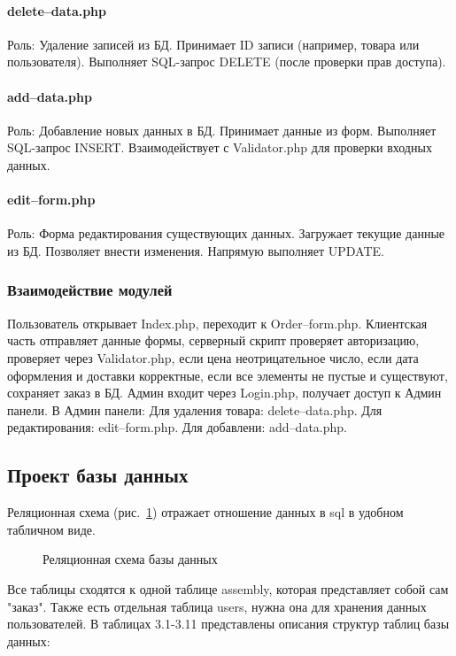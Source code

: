 \paragraph{delete--data.php}
Роль: Удаление записей из БД.
Принимает ID записи (например, товара или пользователя).
Выполняет SQL-запрос DELETE (после проверки прав доступа).
\paragraph{add--data.php}
Роль: Добавление новых данных в БД.
Принимает данные из форм.
Выполняет SQL-запрос INSERT.
Взаимодействует с Validator.php для проверки входных данных.

\paragraph{edit--form.php}
Роль: Форма редактирования существующих данных.
Загружает текущие данные из БД.
Позволяет внести изменения.
Напрямую выполняет UPDATE.

\subsubsection{Взаимодействие модулей}
Пользователь открывает Index.php, переходит к Order--form.php.
Клиентская часть отправляет данные формы, серверный скрипт проверяет авторизацию, проверяет через Validator.php, если цена неотрицательное число, если дата оформления и доставки корректные, если все элементы не пустые и существуют, сохраняет заказ в БД.
Админ входит через Login.php, получает доступ к Админ панели.
В Админ панели:
Для удаления товара: delete--data.php.
Для редактирования: edit--form.php.
Для добавлени: add--data.php.

\newpage
\subsection{Проект базы данных}

Реляционная схема (рис.~\ref{struct:image}) отражает отношение данных в sql в удобном табличном виде.

\vspace{-8mm} 
\begin{figure}[ht]
\caption{Реляционная схема базы данных}
\label{struct:image}
\end{figure}

Все таблицы сходятся к одной таблице assembly, которая представляет собой сам "заказ". Также есть отдельная таблица users, нужна она для хранения данных пользователей.
В таблицах 3.1-3.11 представлены описания структур таблиц базы данных:

